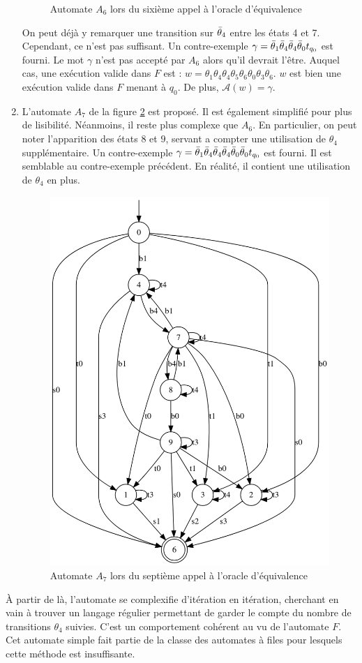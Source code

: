 \begin{enumerate}
\begin{figure}[H]
    \caption{Automate $A_6$ lors du sixième appel à l'oracle d'équivalence}\label{fig:andre6}
  \end{figure}
  On peut déjà y remarquer une transition sur $\bar{\theta}_4$ entre les états 4 et 7. Cependant, ce n'est pas suffisant. Un contre-exemple $\gamma=\bar{\theta}_1\bar{\theta}_4\bar{\theta}_4\bar{\theta}_0t_{q_0}$ est fourni. Le mot $\gamma$ n'est pas accepté par $A_6$ alors qu'il devrait l'être. Auquel cas, une exécution valide dans $F$ est : $w=\theta_1\theta_4\theta_4\theta_5\theta_6\theta_0\theta_3\theta_6$. $w$ est bien une exécution valide dans $F$ menant à $q_0$. De plus, $\mathcal{A}(w)=\gamma$.
  \item L'automate $A_7$ de la figure \ref{fig:andre7} est proposé. Il est également simplifié pour plus de lisibilité.
  Néanmoins, il reste plus complexe que $A_6$. En particulier, on peut noter l'apparition des états $8$ et $9$, servant a compter une utilisation de $\theta_4$ supplémentaire.
  Un contre-exemple $\gamma=\bar{\theta}_1\bar{\theta}_4\bar{\theta}_4\bar{\theta}_4\bar{\theta}_0\bar{\theta}_0t_{q_0}$ est fourni. Il est semblable au contre-exemple précédent. En réalité, il contient une utilisation de $\theta_4$ en plus.

  \begin{figure}[H]
    \centering
    \includegraphics[width=0.6\linewidth]{res/andre_7}
    \caption{Automate $A_7$ lors du septième appel à l'oracle d'équivalence}\label{fig:andre7}
  \end{figure}

\end{enumerate}

À partir de là, l'automate se complexifie d'itération en itération, cherchant en vain à trouver un langage régulier permettant de garder le compte du nombre de transitions $\theta_4$ suivies. C'est un comportement cohérent au vu de l'automate $F$. Cet automate simple fait partie de la classe des automates à files pour lesquels cette méthode est insuffisante.
